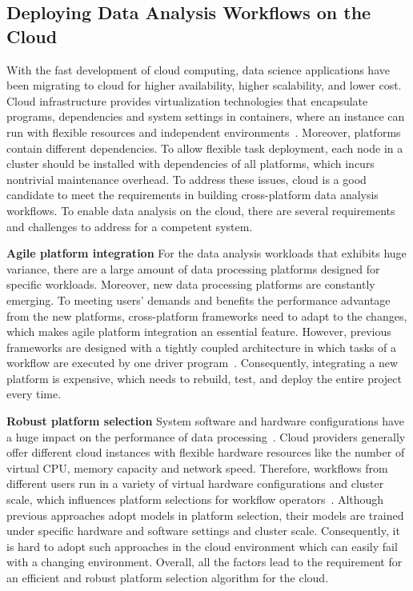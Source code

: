 \subsection{Deploying Data Analysis Workflows on the Cloud}

With the fast development of cloud computing, data science applications have been migrating to cloud for higher availability, higher scalability, and lower cost.
Cloud infrastructure provides virtualization technologies that encapsulate programs, dependencies and system settings in containers, where an instance can run with flexible resources and independent environments~\cite{wang2017myria}. Moreover, platforms contain different dependencies. To allow flexible task deployment, each node in a cluster should be installed with dependencies of all platforms, which incurs nontrivial maintenance overhead. 
To address these issues, cloud is a good candidate to meet the requirements in building cross-platform data analysis workflows.
To enable data analysis on the cloud, there are several requirements and challenges to address for a competent system.

\textbf{Agile platform integration} For the data analysis workloads that exhibits huge variance, there are a large amount of data processing platforms designed for specific workloads. Moreover, new data processing platforms are constantly emerging. To meeting users' demands and benefits the performance advantage from the new platforms, cross-platform frameworks need to adapt to the changes, which makes agile platform integration an essential feature. However, previous frameworks are designed with a tightly coupled architecture in which tasks of a workflow are executed by one driver program~\cite{balalaie2015migrating}. Consequently, integrating a new platform is expensive, which needs to rebuild, test, and deploy the entire project every time.


\textbf{Robust platform selection} System software and hardware configurations have a huge impact on the performance of data processing~\cite{mattson2019mlperf}. Cloud providers generally offer different cloud instances with flexible hardware resources like the number of virtual CPU, memory capacity and network speed. Therefore, workflows from different users run in a variety of virtual hardware configurations and cluster scale, which influences platform selections for workflow operators~\cite{}. Although previous approaches adopt models in platform selection, their models are trained under specific hardware and software settings and cluster scale. Consequently, it is hard to adopt such approaches in the cloud environment which can easily fail with a changing environment. Overall, all the factors lead to the requirement for an efficient and robust platform selection algorithm for the cloud.


